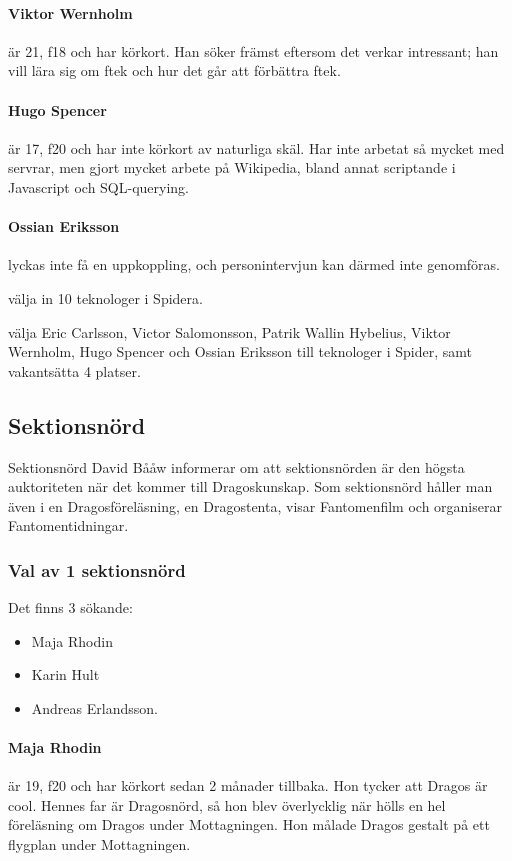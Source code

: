 \documentclass[hidelinks]{sektionsmote}
\begin{document}
\paragraph{Viktor Wernholm} är 21, f18 och har körkort.
Han söker främst eftersom det verkar intressant; han vill lära sig om ftek och hur det går att förbättra ftek.

\paragraph{Hugo Spencer} är 17, f20 och har inte körkort av naturliga skäl.
Har inte arbetat så mycket med servrar, men gjort mycket arbete på Wikipedia, bland annat scriptande i Javascript och SQL-querying.

\paragraph{Ossian Eriksson} lyckas inte få en uppkoppling, och personintervjun kan därmed inte genomföras.

\begin{beslut}
  \item välja in 10 teknologer i Spidera.
  \item välja Eric Carlsson, Victor Salomonsson, Patrik Wallin Hybelius, Viktor Wernholm, Hugo Spencer och Ossian Eriksson till teknologer i Spider, samt vakantsätta 4 platser.
\end{beslut}


\subsection{Sektionsnörd}
Sektionsnörd David Bååw informerar om att sektionsnörden är den högsta auktoriteten när det kommer till Dragoskunskap.
Som sektionsnörd håller man även i en Dragosföreläsning, en Dragostenta, visar Fantomenfilm och organiserar Fantomentidningar.

\subsubsection{Val av 1 sektionsnörd}
Det finns 3 sökande:
\begin{itemize}
    \item Maja Rhodin
    \item Karin Hult
    \item Andreas Erlandsson.
\end{itemize}

\paragraph{Maja Rhodin} är 19, f20 och har körkort sedan 2 månader tillbaka.
Hon tycker att Dragos är cool.
Hennes far är Dragosnörd, så hon blev överlycklig när hölls en hel föreläsning om Dragos under Mottagningen.
Hon målade Dragos gestalt på ett flygplan under Mottagningen.
\end{document}
